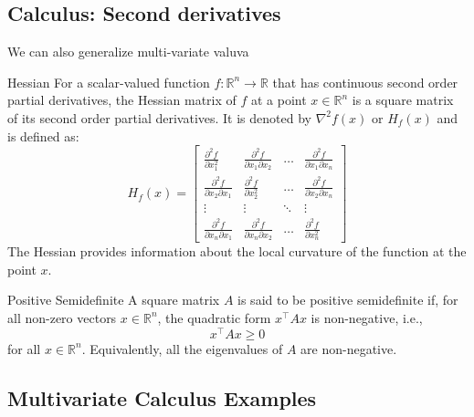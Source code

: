 \subsection{Calculus: Second derivatives}
We can also generalize multi-variate valuva

\begin{definition}{Hessian}{}
For a scalar-valued function \( f: \mathbb{R}^n \rightarrow \mathbb{R} \) that has continuous second order partial derivatives, the Hessian matrix of \( f \) at a point \( x \in \mathbb{R}^n \) is a square matrix of its second order partial derivatives. It is denoted by \( \nabla^2 f(x) \) or \( H_f(x) \) and is defined as:
\[
H_f(x) = \begin{bmatrix}
\frac{\partial^2 f}{\partial x_1^2} & \frac{\partial^2 f}{\partial x_1 \partial x_2} & \dots & \frac{\partial^2 f}{\partial x_1 \partial x_n} \\
\frac{\partial^2 f}{\partial x_2 \partial x_1} & \frac{\partial^2 f}{\partial x_2^2} & \dots & \frac{\partial^2 f}{\partial x_2 \partial x_n} \\
\vdots & \vdots & \ddots & \vdots \\
\frac{\partial^2 f}{\partial x_n \partial x_1} & \frac{\partial^2 f}{\partial x_n \partial x_2} & \dots & \frac{\partial^2 f}{\partial x_n^2}
\end{bmatrix}
\]
The Hessian provides information about the local curvature of the function at the point \( x \).
\end{definition}



\begin{definition}{Positive Semidefinite}{}
A square matrix \( A \) is said to be positive semidefinite if, for all non-zero vectors \( x \in \mathbb{R}^n \), the quadratic form \( x^\top A x \) is non-negative, i.e.,
\[
x^\top A x \geq 0
\]
for all \( x \in \mathbb{R}^n \). Equivalently, all the eigenvalues of \( A \) are non-negative.
\end{definition}



\subsection{Multivariate Calculus Examples}

